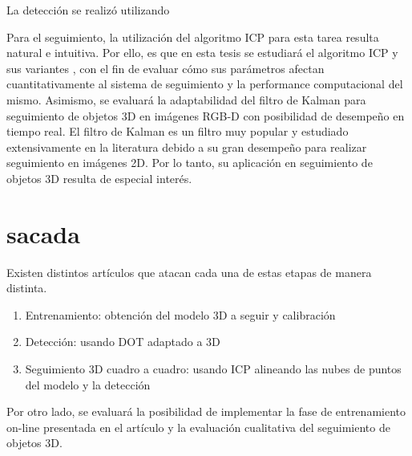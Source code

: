 La detección se realizó utilizando \cite{6630856}


Para el seguimiento, la utilización del algoritmo ICP \cite{zhang94icp,besl92icp} para esta tarea resulta natural e intuitiva. Por ello, es que en esta tesis se estudiará el algoritmo ICP y sus variantes \cite{estepar2004robust,segal2009generalized}, con el fin de evaluar cómo sus parámetros afectan cuantitativamente al sistema de seguimiento y la performance computacional del mismo. Asimismo, se evaluará la adaptabilidad del filtro de Kalman \cite{welch1995introduction} para seguimiento de objetos 3D en imágenes RGB-D con posibilidad de desempeño en tiempo real. El filtro de Kalman es un filtro muy popular y estudiado extensivamente en la literatura \cite{julier1997new,wan2000unscented} debido a su gran desempeño para realizar seguimiento en imágenes 2D. Por lo tanto, su aplicación en seguimiento de objetos 3D resulta de especial interés.




\section{sacada}
Existen distintos artículos que atacan cada una de estas etapas de manera distinta. 
\begin{enumerate}
  \item Entrenamiento: obtención del modelo 3D a seguir y calibración
  \item Detección: usando DOT \cite{hinterstoisser2010dominant} adaptado a 3D
  \item Seguimiento 3D cuadro a cuadro: usando ICP \cite{zhang94icp,besl92icp} alineando las nubes de puntos del modelo y la detección
\end{enumerate}

Por otro lado, se evaluará la posibilidad de implementar la fase de entrenamiento on-line presentada en el artículo \cite{park2011texture} y la evaluación cualitativa del seguimiento de objetos 3D.